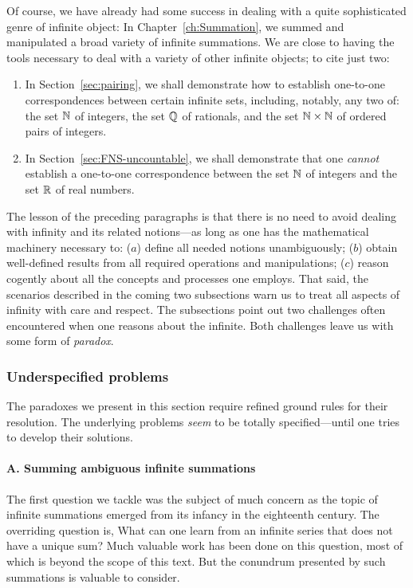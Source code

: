 Of course, we have already had some success in dealing with a quite sophisticated genre of infinite object:  In Chapter~\ref{ch:Summation}, we summed and manipulated a broad variety of infinite summations.  We are close to having the tools necessary to deal with a variety of other infinite objects; to cite just two:
\begin{enumerate}
\item
In Section~\ref{sec:pairing}, we shall demonstrate how to establish one-to-one correspondences between certain infinite sets, including, notably, any two of: the set $\mathbb{N}$ of integers, the set $\mathbb{Q}$ of rationals, and the set $\mathbb{N} \times \mathbb{N}$ of ordered pairs of integers.

\medskip\item
In Section~\ref{sec:FNS-uncountable}, we shall demonstrate that one {\em cannot} establish a one-to-one correspondence between the set $\mathbb{N}$ of integers and the set $\mathbb{R}$ of real numbers.
\end{enumerate}

\smallskip

The lesson of the preceding paragraphs is that there is no need to avoid dealing with infinity and its related notions---as long as one has the mathematical machinery necessary to: ($a$) define all needed notions unambiguously; ($b$) obtain well-defined results from all required operations and manipulations; ($c$) reason cogently about all the concepts and processes one employs.  That said, the scenarios described in the coming two subsections warn us to treat all aspects of infinity with care and respect.  The subsections point out two challenges often encountered when one reasons about the infinite.  Both challenges leave us with some form of {\em paradox}.

\subsubsection{Underspecified problems}
\label{sec:underspecified}

The paradoxes we present in this section require refined ground rules for their resolution.  
The underlying problems {\em seem} to be totally specified---until one tries to develop their solutions.

\paragraph{A. Summing ambiguous infinite summations}

The first question we tackle was the subject of much concern as the topic of infinite summations emerged from its infancy in the eighteenth century.  The overriding question is, What can one learn from an infinite series that does not have a unique sum?  Much valuable work has been done on this question, most of which is beyond the scope of this text.  But the conundrum presented by 
such summations is valuable to consider.

